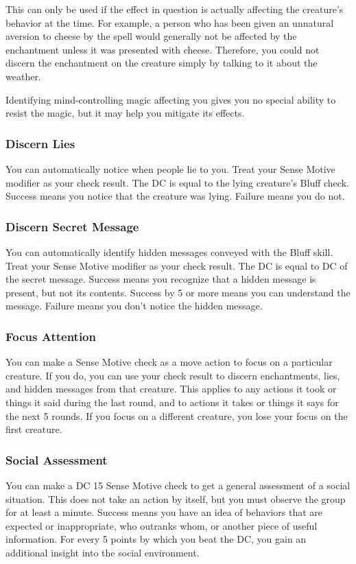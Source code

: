 This can only be used if the effect in question is actually affecting the creature's behavior at the time. For example, a person who has been given an unnatural aversion to cheese by the  spell would generally not be affected by the enchantment unless it was presented with cheese. Therefore, you could not discern the enchantment on the creature simply by talking to it about the weather.

Identifying mind-controlling magic affecting you gives you no special ability to resist the magic, but it may help you mitigate its effects.

\subsubsection{Discern Lies}
You can automatically notice when people lie to you. Treat your Sense Motive modifier as your check result. The DC is equal to the lying creature's Bluff check. Success means you notice that the creature was lying. Failure means you do not.

\subsubsection{Discern Secret Message}
You can automatically identify hidden messages conveyed with the Bluff skill. Treat your Sense Motive modifier as your check result. The DC is equal to DC of the secret message. Success means you recognize that a hidden message is present, but not its contents. Success by 5 or more means you can understand the message. Failure means you don't notice the hidden message.

\subsubsection{Focus Attention}
You can make a Sense Motive check as a move action to focus on a particular creature. If you do, you can use your check result to discern enchantments, lies, and hidden messages from that creature. This applies to any actions it took or things it said during the last round, and to actions it takes or things it says for the next 5 rounds. If you focus on a different creature, you lose your focus on the first creature.

\subsubsection{Social Assessment}
You can make a DC 15 Sense Motive check to get a general assessment of a social situation. This does not take an action by itself, but you must observe the group for at least a minute. Success means you have an idea of behaviors that are expected or inappropriate, who outranks whom, or another piece of useful information. For every 5 points by which you beat the DC, you gain an additional insight into the social environment.


